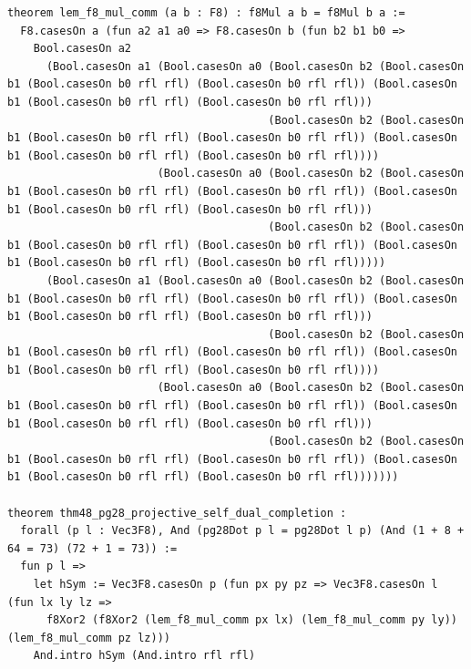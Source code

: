 \documentclass[11pt,letterpaper]{article}
\theoremstyle{spectralthm}
\begin{document}
\begin{lstlisting}[language=Lean4,caption={Standalone Pure Init.Prelude Term-Mode Lean 4 Kernel Suite (thm30--thm61, v0.0.0, 0 sorry, 0 axioms).},label={lst:lean_unified}]
theorem lem_f8_mul_comm (a b : F8) : f8Mul a b = f8Mul b a :=
  F8.casesOn a (fun a2 a1 a0 => F8.casesOn b (fun b2 b1 b0 =>
    Bool.casesOn a2
      (Bool.casesOn a1 (Bool.casesOn a0 (Bool.casesOn b2 (Bool.casesOn b1 (Bool.casesOn b0 rfl rfl) (Bool.casesOn b0 rfl rfl)) (Bool.casesOn b1 (Bool.casesOn b0 rfl rfl) (Bool.casesOn b0 rfl rfl)))
                                        (Bool.casesOn b2 (Bool.casesOn b1 (Bool.casesOn b0 rfl rfl) (Bool.casesOn b0 rfl rfl)) (Bool.casesOn b1 (Bool.casesOn b0 rfl rfl) (Bool.casesOn b0 rfl rfl))))
                       (Bool.casesOn a0 (Bool.casesOn b2 (Bool.casesOn b1 (Bool.casesOn b0 rfl rfl) (Bool.casesOn b0 rfl rfl)) (Bool.casesOn b1 (Bool.casesOn b0 rfl rfl) (Bool.casesOn b0 rfl rfl)))
                                        (Bool.casesOn b2 (Bool.casesOn b1 (Bool.casesOn b0 rfl rfl) (Bool.casesOn b0 rfl rfl)) (Bool.casesOn b1 (Bool.casesOn b0 rfl rfl) (Bool.casesOn b0 rfl rfl)))))
      (Bool.casesOn a1 (Bool.casesOn a0 (Bool.casesOn b2 (Bool.casesOn b1 (Bool.casesOn b0 rfl rfl) (Bool.casesOn b0 rfl rfl)) (Bool.casesOn b1 (Bool.casesOn b0 rfl rfl) (Bool.casesOn b0 rfl rfl)))
                                        (Bool.casesOn b2 (Bool.casesOn b1 (Bool.casesOn b0 rfl rfl) (Bool.casesOn b0 rfl rfl)) (Bool.casesOn b1 (Bool.casesOn b0 rfl rfl) (Bool.casesOn b0 rfl rfl))))
                       (Bool.casesOn a0 (Bool.casesOn b2 (Bool.casesOn b1 (Bool.casesOn b0 rfl rfl) (Bool.casesOn b0 rfl rfl)) (Bool.casesOn b1 (Bool.casesOn b0 rfl rfl) (Bool.casesOn b0 rfl rfl)))
                                        (Bool.casesOn b2 (Bool.casesOn b1 (Bool.casesOn b0 rfl rfl) (Bool.casesOn b0 rfl rfl)) (Bool.casesOn b1 (Bool.casesOn b0 rfl rfl) (Bool.casesOn b0 rfl rfl)))))))

theorem thm48_pg28_projective_self_dual_completion :
  forall (p l : Vec3F8), And (pg28Dot p l = pg28Dot l p) (And (1 + 8 + 64 = 73) (72 + 1 = 73)) :=
  fun p l =>
    let hSym := Vec3F8.casesOn p (fun px py pz => Vec3F8.casesOn l (fun lx ly lz =>
      f8Xor2 (f8Xor2 (lem_f8_mul_comm px lx) (lem_f8_mul_comm py ly)) (lem_f8_mul_comm pz lz)))
    And.intro hSym (And.intro rfl rfl)


\end{lstlisting}
\end{document}
